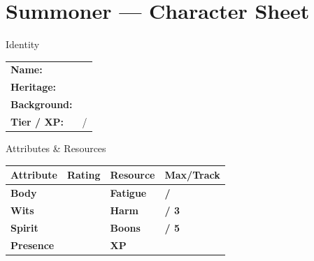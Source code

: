 \documentclass[10pt]{article}
\begin{document}
\newpage

\section*{Summoner --- Character Sheet}

\begin{minipage}[t]{0.48\linewidth}
    \begin{charbox}{Identity}
        \begin{tabular}{p{2.5cm} p{5cm}}
            \textbf{Name:} & \underline{\hspace{4cm}} \\
            \textbf{Heritage:} & \underline{\hspace{4cm}} \\
            \textbf{Background:} & \underline{\hspace{4cm}} \\
            \textbf{Tier / XP:} & \underline{\hspace{2cm}} / \underline{\hspace{2cm}} \\
        \end{tabular}
    \end{charbox}
    
    \vspace{0.5em}
    
    \begin{charbox}{Attributes \& Resources}
        \begin{tabular}{>{\bfseries}p{2.5cm} >{\bfseries}p{1.5cm} >{\bfseries}p{2.5cm} >{\bfseries}p{1.5cm}}
            \toprule
            \textbf{Attribute} & \textbf{Rating} & \textbf{Resource} & \textbf{Max/Track} \\
            \midrule
            Body & \underline{\hspace{1.5cm}} & Fatigue & \underline{\hspace{1.5cm}} / \underline{\hspace{1.5cm}} \\
            Wits & \underline{\hspace{1.5cm}} & Harm & \underline{\hspace{1.5cm}} / 3 \\
            Spirit & \underline{\hspace{1.5cm}} & Boons & \underline{\hspace{1.5cm}} / 5 \\
            Presence & \underline{\hspace{1.5cm}} & XP & \underline{\hspace{1.5cm}} \\
            \bottomrule
        \end{tabular}
    \end{charbox}
    

\end{minipage}
\end{document}
